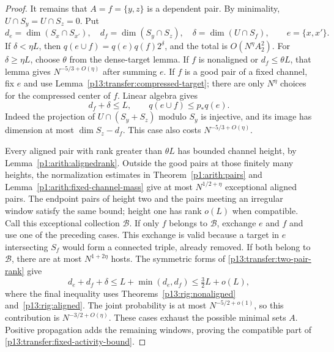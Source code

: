 \begin{proof}
It remains that $A=f=\{y,z\}$ is a dependent pair. By minimality,
$U\cap S_y=U\cap S_z=0$. Put
\[
 d_e=\dim(S_x\cap S_{x'}),\quad d_f=\dim(S_y\cap S_z),\quad
 \delta=\dim(U\cap S_f),\qquad e=\{x,x'\}.
\]
If $\delta<\eta L$, then
$q(e\cup f)=q(e)q(f)2^\delta$, and the total is
$O(N^\eta A_2^2)$.
For $\delta\geq\eta L$, choose $\theta$ from the dense-target lemma.
If $f$ is nonaligned or $d_f\leq\theta L$, that lemma gives
$N^{-5/3+O(\eta)}$ after summing $e$.
If $f$ is a good pair of a fixed channel, fix $e$ and use
Lemma~\ref{p13:transfer:compressed-target}; there are only
$N^\eta$ choices for the compressed center of $f$. Linear algebra gives
\begin{equation}
 d_f+\delta\leq L,
 \qquad q(e\cup f)\leq p_*q(e).
 \label{p13:transfer:two-pair-rank}
\end{equation}
Indeed the projection of $U\cap(S_y+S_z)$ modulo $S_y$ is injective,
and its image has dimension at most $\dim S_z-d_f$.
This case also costs $N^{-5/3+O(\eta)}$.

Every aligned pair with rank greater than $\theta L$ has bounded
channel height, by Lemma~\ref{p1:arith:alignedrank}. Outside the good
pairs at those finitely many heights, the normalization estimates in
Theorem~\ref{p1:arith:pairs} and
 Lemma~\ref{p1:arith:fixed-channel-mass} give at most
$N^{1/2+\eta}$ exceptional aligned pairs. The endpoint pairs of height
two and the pairs meeting an irregular window satisfy the same bound;
height one has rank $o(L)$ when compatible.
Call this exceptional collection $\mathcal B$.
If only $f$ belongs to $\mathcal B$, exchange $e$ and $f$ and use one
of the preceding cases. This exchange is valid because a target in
$e$ intersecting $S_f$ would form a connected triple, already removed.
If both belong to $\mathcal B$, there are at most $N^{1+2\eta}$ hosts.
The symmetric forms of \eqref{p13:transfer:two-pair-rank} give
\[
 d_e+d_f+\delta\leq L+\min(d_e,d_f)\leq\tfrac32L+o(L),
\]
where the final inequality uses
Theorems~\ref{p13:rig:nonaligned} and~\ref{p13:rig:aligned}.
The joint probability is at most $N^{-5/2+o(1)}$, so this contribution
is $N^{-3/2+O(\eta)}$. These cases exhaust the possible minimal sets
$A$. Positive propagation adds the remaining windows, proving the
compatible part of \eqref{p13:transfer:fixed-activity-bound}.


\end{proof}
